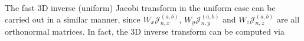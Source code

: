 \documentclass[11pt]{article}
\begin{document}
The fast 3D inverse (uniform) Jacobi transform in the uniform case can be carried out in a similar manner, since $W_{x}\mathcal{J}_{n,x}^{(a,b)}$, $W_{y}\mathcal{J}_{n,y}^{(a,b)}$ and $W_{z}\mathcal{J}_{n,z}^{(a,b)}$ are all orthonormal matrices. In fact, the 3D inverse transform can be computed via
\end{document}
